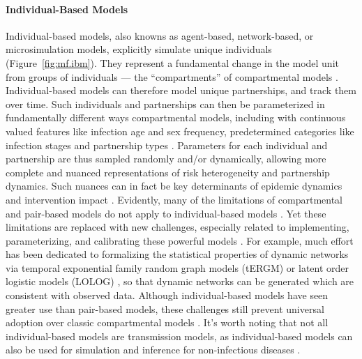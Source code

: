 \paragraph{Individual-Based Models}
Individual-based models, also knowns as agent-based, network-based, or microsimulation models,
explicitly simulate unique individuals (Figure~\ref{fig:mf.ibm}).
They represent a fundamental change in the model unit from groups of individuals
--- \ie the ``compartments'' of compartmental models \cite{Rao2021}.
Individual-based models can therefore model unique partnerships, and track them over time.
Such individuals and partnerships can then be
parameterized in fundamentally different ways \vs compartmental models,
including with continuous valued features like infection age and sex frequency,
\vs predetermined categories like infection stages and partnership types \cite{Pellis2015,Rao2021}.
Parameters for each individual and partnership are thus sampled randomly and/or dynamically,
allowing more complete and nuanced representations of risk heterogeneity and partnership dynamics.
Such nuances can in fact be key determinants of epidemic dynamics and intervention impact
\cite{Hontelez2013,Johnson2016mf}.
Evidently, many of the limitations of compartmental and pair-based models
do not apply to individual-based models \cite{Rao2021}.
Yet these limitations are replaced with new challenges,
especially related to implementing, parameterizing, and calibrating these powerful models
\cite{Rao2021,Pellis2015,Hazelbag2020}.
For example, much effort has been dedicated to
formalizing the statistical properties of dynamic networks
via temporal exponential family random graph models (tERGM) \cite{Jenness2018}
or latent order logistic models (LOLOG) \cite{Clark2022},
so that dynamic networks can be generated which are consistent with observed data.
Although individual-based models have seen greater use than pair-based models,
these challenges still prevent universal adoption over classic compartmental models \cite{Rao2021}.
It's worth noting that not all individual-based models are transmission models,
as individual-based models can also be used for
simulation and inference for non-infectious diseases \cite{Silverman2021}.
\clearpage %
